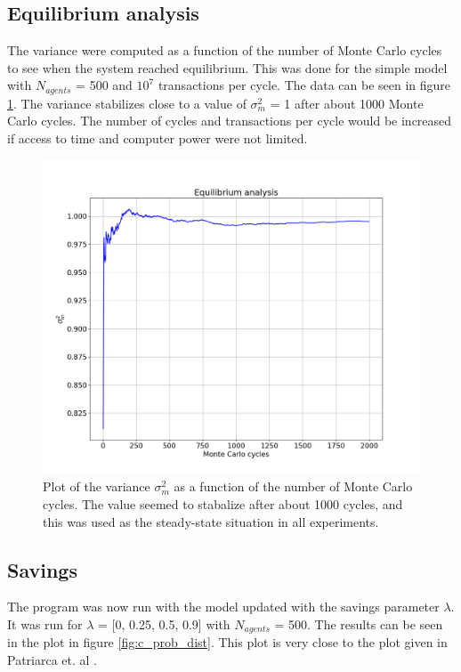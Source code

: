 \documentclass[11pt,a4paper,titlepage]{article}
\begin{document}
\subsection{Equilibrium analysis}
The variance were computed as a function of the number of Monte Carlo cycles to see when the system reached equilibrium. This was done for the simple model with $N_{agents}$ = 500 and $\textrm{$10^7$}$ transactions per cycle. The data can be seen in figure \ref{fig:b_equi}. The variance stabilizes close to a value of $\sigma^2_m$ = 1 after about 1000 Monte Carlo cycles. The number of cycles and transactions per cycle would be increased if access to time and computer power were not limited. 

\begin{figure}[h!]
\centering
\includegraphics[scale=0.33]{task_b_equi.png}
\caption{Plot of the variance $\sigma^2_m$ as a function of the number of Monte Carlo cycles. The value seemed to stabalize after about 1000 cycles, and this was used as the steady-state situation in all experiments.  \label{fig:b_equi}}
\end{figure}

\subsection{Savings}
The program was now run with the model updated with the savings parameter $\lambda$. It was run for $\lambda$ = [0, 0.25, 0.5, 0.9] with $N_{agents}$ = 500. The results can be seen in the plot in figure \ref{fig:c_prob_dist}. This plot is very close to the plot given in Patriarca et. al \cite{Patriarca}. 
\end{document}
